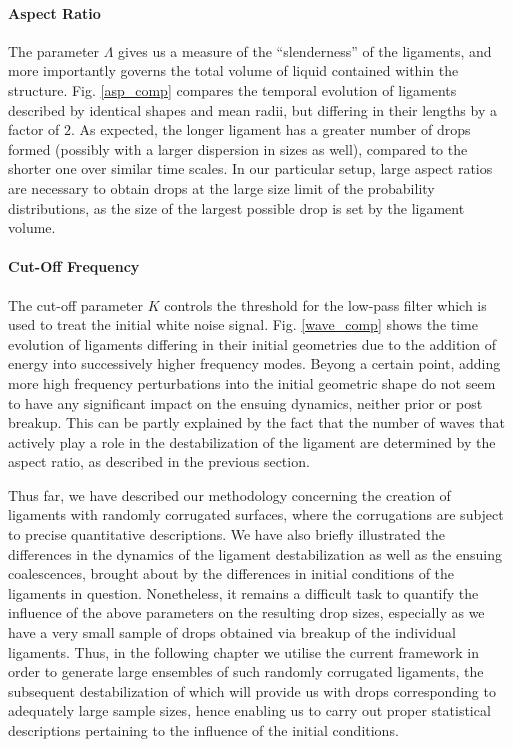 \paragraph{Aspect Ratio}
The parameter $\Lambda$ gives us a measure of the ``slenderness'' of the ligaments, 
and more importantly governs the total volume of liquid contained within the structure. 
Fig. \ref{asp_comp} compares the temporal evolution of ligaments described by identical 
shapes and mean radii, but differing in their lengths by a factor of $2$.  
As expected, the longer ligament has a greater number of drops formed (possibly with 
a larger dispersion in sizes as well), compared to the shorter one over similar time scales. 
In our particular setup, large aspect ratios are necessary to obtain drops at the large size limit 
of the probability distributions, as the size of the largest possible drop is set by the ligament volume.  

\paragraph{Cut-Off Frequency}
The cut-off parameter $K$ controls the threshold for the low-pass filter
which is used to treat the initial white noise signal.
Fig. \ref{wave_comp} shows the time evolution of ligaments differing in their     
initial geometries due to the addition of energy into successively higher frequency modes. 
Beyong a certain point, adding more high frequency perturbations into the initial geometric shape 
do not seem to have any significant impact on the ensuing dynamics, neither prior or post breakup.
This can be partly explained by the fact that the number of waves that actively play a role in the 
destabilization of the ligament are determined by the aspect ratio, as described in the previous section. 


Thus far, we have described our methodology concerning the creation of ligaments 
with randomly corrugated surfaces, where the corrugations are subject to precise quantitative descriptions. 
We have also briefly illustrated the differences in the dynamics of the ligament destabilization as well 
as the ensuing coalescences, brought about by the differences in initial conditions of the ligaments in question. 
Nonetheless, it remains a difficult task to quantify the influence of the above parameters on the resulting
drop sizes, especially as we have a very small sample of drops obtained via breakup of the individual ligaments. 
Thus, in the following chapter we utilise the current framework in order to generate large ensembles of such 
randomly corrugated ligaments, the subsequent destabilization of which will provide us with drops corresponding to 
adequately large sample sizes, hence enabling us to carry out proper statistical 
descriptions pertaining to the influence of the initial conditions. 

